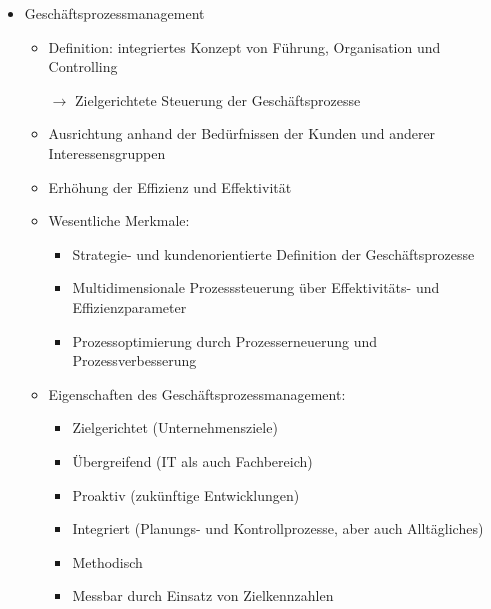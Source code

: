 \begin{itemize}
\item Geschäftsprozessmanagement
	\begin{itemize}
	\item Definition: integriertes Konzept von Führung, Organisation und Controlling
	\item[$\rightarrow$] Zielgerichtete Steuerung der Geschäftsprozesse
	\item Ausrichtung anhand der Bedürfnissen der Kunden und anderer Interessensgruppen
	\item Erhöhung der Effizienz und Effektivität
	\item Wesentliche Merkmale:
		\begin{itemize}
		\item Strategie- und kundenorientierte Definition der Geschäftsprozesse
		\item Multidimensionale Prozesssteuerung über Effektivitäts- und Effizienzparameter
		\item Prozessoptimierung durch Prozesserneuerung und Prozessverbesserung
		\end{itemize}
	\item Eigenschaften des Geschäftsprozessmanagement:
		\begin{itemize}
		\item Zielgerichtet (Unternehmensziele)
		\item Übergreifend (IT als auch Fachbereich)
		\item Proaktiv (zukünftige Entwicklungen)
		\item Integriert (Planungs- und Kontrollprozesse, aber auch Alltägliches)
		\item Methodisch
		\item Messbar durch Einsatz von Zielkennzahlen
		\end{itemize}			
	\end{itemize}
	
	
\end{itemize}

